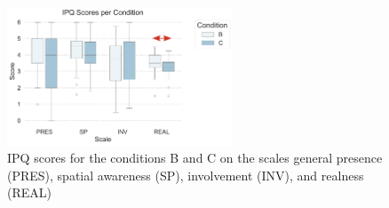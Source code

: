 \begin{figure}[htb]
   \begin{center}
   	   \includegraphics[width=0.6\textwidth]{include/images/ipq_per_condition}
   	\captionsetup{subrefformat=parens}
   	\caption{\gls{IPQ} scores for the conditions B and C on the scales general presence (PRES), spatial awareness (SP), involvement (INV), and \textcolor{secondary}{realness (REAL)}}
   	\label{fig:presence}
   \end{center}
\end{figure}